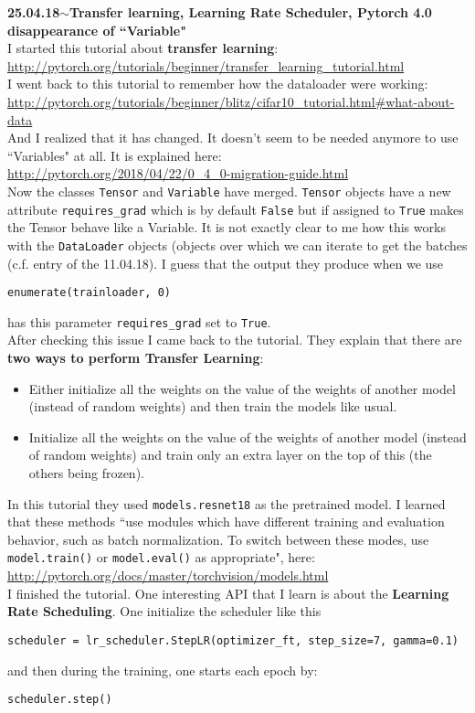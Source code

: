 \documentclass[11pt,a4paper]{article}
\newenvironment{loggentry}[2]%
{\noindent\textbf{#1}\hspace{1cm}$\mathbf{\sim}$\text{ }\textbf{#2}\\}{\vspace{0.5cm}}
\begin{document}
\begin{loggentry}{25.04.18}{Transfer learning, Learning Rate Scheduler, Pytorch 4.0 disappearance of ``Variable"}
I started this tutorial about \textbf{transfer learning}:\\
\url{http://pytorch.org/tutorials/beginner/transfer_learning_tutorial.html}\\
I went back to this tutorial to remember how the dataloader were working:\\
\url{http://pytorch.org/tutorials/beginner/blitz/cifar10_tutorial.html#what-about-data}\\
And I realized that it has changed. It doesn't seem to be needed anymore to use ``Variables" at all. It is explained here:\\
\url{http://pytorch.org/2018/04/22/0_4_0-migration-guide.html}\\
Now the classes \texttt{Tensor} and \texttt{Variable} have merged. \texttt{Tensor} objects have a new attribute \texttt{requires\_grad} which is by default \texttt{False} but if assigned to \texttt{True} makes the Tensor behave like a Variable. It is not exactly clear to me how this works with the \texttt{DataLoader} objects (objects over which we can iterate to get the batches (c.f. entry of the 11.04.18). I guess that the output they produce when we use
\begin{verbatim}
enumerate(trainloader, 0)
\end{verbatim}
has this parameter \texttt{requires\_grad} set to \texttt{True}.\\
After checking this issue I came back to the tutorial. They explain that there are \textbf{two ways to perform Transfer Learning}:\\
\begin{itemize}
\item Either initialize all the weights on the value of the weights of another model (instead of random weights) and then train the models like usual.
\item Initialize all the weights on the value of the weights of another model (instead of random weights) and train only an extra layer on the top of this (the others being frozen).
\end{itemize}
In this tutorial they used \texttt{models.resnet18} as the pretrained model. I learned that these methods ``use modules which have different training and evaluation behavior, such as batch normalization. To switch between these modes, use \texttt{model.train()} or \texttt{model.eval()} as appropriate", here:\\
\url{http://pytorch.org/docs/master/torchvision/models.html}\\
I finished the tutorial. One interesting API that I learn is about the \textbf{Learning Rate Scheduling}. One initialize the scheduler like this
\begin{verbatim}
scheduler = lr_scheduler.StepLR(optimizer_ft, step_size=7, gamma=0.1)
\end{verbatim}
and then during the training, one starts each epoch by:\\
\begin{verbatim}
scheduler.step()
\end{verbatim}
\end{loggentry}
\end{document}

